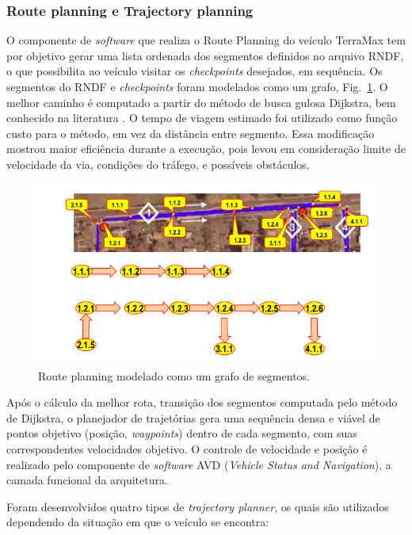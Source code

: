 \subsubsection{Route planning e Trajectory planning}

O componente de \emph{software} que realiza o Route Planning do veículo TerraMax tem
por objetivo gerar uma lista ordenada dos segmentos definidos no arquivo RNDF, o
que possibilita ao veículo visitar os \textit{checkpoints} desejados, em
sequência. Os segmentos do RNDF e \textit{checkpoints} foram modelados como um
grafo, Fig.~\ref{fig:route}. O melhor caminho é computado a partir do método de
busca gulosa Dijkstra, bem conhecido na literatura \cite{cormen2001dijkstra}. O
tempo de viagem estimado foi utilizado como função custo para o método, em vez
da distância entre segmento. Essa modificação mostrou maior eficiência durante a
execução, pois levou em consideração limite de velocidade da via, condições do
tráfego, e possíveis obstáculos.

\begin{figure}[!ht]
\centering
\includegraphics[width=\columnwidth]{figs/route}
\caption{Route planning modelado como um grafo de segmentos.}
\label{fig:route}
\end{figure}

Após o cálculo da melhor rota, transição dos segmentos computada pelo método de
Dijkstra, o planejador de trajetórias gera uma sequência densa e viável de
pontos objetivo (posição, \textit{waypoints}) dentro de cada segmento, com suas
correspondentes velocidades objetivo. O controle de velocidade e posição é
realizado pelo componente de \emph{software} AVD (\textit{Vehicle Status and
Navigation}), a camada funcional da arquitetura.

Foram desenvolvidos quatro tipos de \textit{trajectory planner}, os quais são
utilizados dependendo da situação em que o veículo se encontra:

